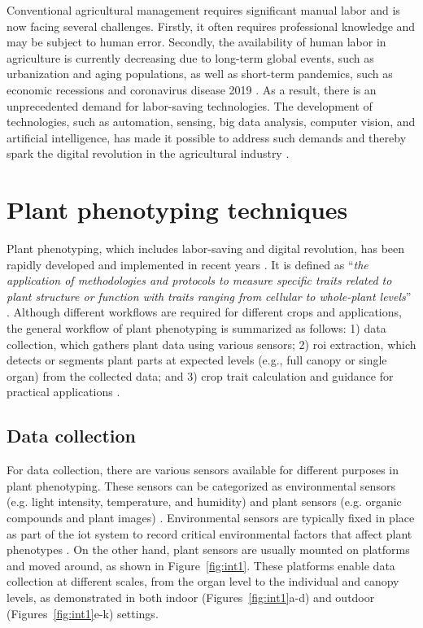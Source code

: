 Conventional agricultural management requires significant manual labor and is now facing several challenges. Firstly, it often requires professional knowledge and may be subject to human error. Secondly, the availability of human labor in agriculture is currently decreasing due to long-term global events, such as urbanization and aging populations, as well as short-term pandemics, such as economic recessions and coronavirus disease 2019 \citep{gallardo_adoption_2018, larue_labor_2020}. As a result, there is an unprecedented demand for labor-saving technologies. The development of technologies, such as automation, sensing, big data analysis, computer vision, and artificial intelligence, has made it possible to address such demands and thereby spark the digital revolution in the agricultural industry \citep{gallardo_adoption_2018}.

\section{Plant phenotyping techniques}
Plant phenotyping, which includes labor-saving and digital revolution, has been rapidly developed and implemented in recent years \citep{araus_field_2014}. It is defined as ``\textit{the application of methodologies and protocols to measure specific traits related to plant structure or function with traits ranging from cellular to whole-plant levels}'' \citep{fiorani_future_2013, ghanem_physiological_2015}. Although different workflows are required for different crops and applications, the general workflow of plant phenotyping is summarized as follows: 1) data collection, which gathers plant data using various sensors; 2) \gls{roi} extraction, which detects or segments plant parts at expected levels (e.g., full canopy or single organ) from the collected data; and 3) crop trait calculation and guidance for practical applications \citep{zhao_crop_2019}.

\subsection{Data collection}
For data collection, there are various sensors available for different purposes in plant phenotyping. These sensors can be categorized as environmental sensors (e.g. light intensity, temperature, and humidity) and plant sensors (e.g. organic compounds and plant images) \citep{garlando_plants_2020}. Environmental sensors are typically fixed in place as part of the \gls{iot} system to record critical environmental factors that affect plant phenotypes \citep{ghanem_physiological_2015}. On the other hand, plant sensors are usually mounted on platforms and moved around, as shown in Figure~\ref{fig:int1}. These platforms enable data collection at different scales, from the organ level to the individual and canopy levels, as demonstrated in both indoor (Figures~\ref{fig:int1}a-d) and outdoor (Figures~\ref{fig:int1}e-k) settings.

